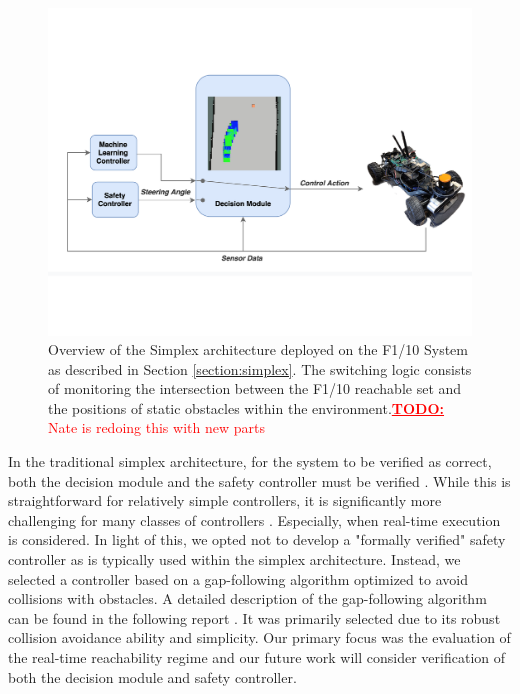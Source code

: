 \documentclass[manuscript,screen,review]{acmart}
\newcommand{\todo}[1]{\textcolor{red}{\textbf{\underline{TODO:}} #1}}
\begin{document}
\begin{figure}[htbp]%
  \centering
  \includegraphics[width=0.8\linewidth]{figures/simplex_real.pdf}
  \caption{Overview of the Simplex architecture deployed on the F1/10 System as described in Section \ref{section:simplex}. The switching logic consists of monitoring the intersection between the F1/10 reachable set and the positions of static obstacles within the environment.\todo{Nate is redoing this with new parts}}
  \label{fig:simplex_arch}
\end{figure}%


In the traditional simplex architecture, for the system to be verified as correct, both the decision module and the safety controller must be verified \cite{Mehmood2021}. While this is straightforward for relatively simple controllers, it is significantly more challenging for many classes of controllers \cite{ivanov2020case}. Especially, when real-time execution is considered. In light of this, we opted not to develop a "formally verified" safety controller as is typically used within the simplex architecture. Instead, we selected a controller based on a gap-following algorithm optimized to avoid collisions with obstacles. A detailed description of the gap-following algorithm can be found in the following report \cite{otterness_2019}. It was primarily selected due to its robust collision avoidance ability and simplicity. Our primary focus was the evaluation of the real-time reachability regime and our future work will consider verification of both the decision module and safety controller. 
\end{document}
